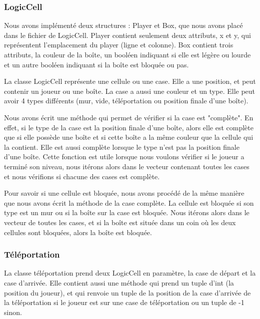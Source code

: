 \documentclass[utf8]{article}
\begin{document}
\begin{large}
\subsubsection{LogicCell}
\indent
\par
Nous avons implémenté deux structures : Player et Box, que nous avons placé dans
le fichier de LogicCell. Player contient seulement deux attributs, x et y, qui
représentent l'emplacement du player (ligne et colonne). Box
contient trois attributs, la couleur de la boîte, un booléen indiquant si elle
est légère ou lourde et un autre booléen indiquant si la boîte est bloquée ou pas.
\par
La classe LogicCell représente une cellule ou une case. Elle a une position, et peut
contenir un joueur ou une boîte. La case a aussi une couleur et un type. Elle
peut avoir 4 types différents (mur, vide, téléportation ou position finale d'une
boîte). 
\par
Nous avons écrit une méthode qui permet de vérifier si la case est "complète".
En effet, si le type de la case est la position finale d'une boîte, alors elle
est complète que si elle possède une boîte et si cette boîte a la même couleur
que la cellule qui la contient. Elle est aussi complète lorsque le type n'est
pas la position finale d'une boîte. Cette fonction est utile lorsque nous
voulons vérifier si le joueur a terminé son niveau, nous itérons alors dans le
vecteur contenant toutes les cases et nous vérifions si chacune des cases est
complète. 
\par
Pour savoir si une cellule est bloquée, nous avons procédé de la même manière
que nous avons écrit la méthode de la case complète. La cellule est bloquée si
son type est un mur ou si la boîte sur la case est bloquée. Nous
itérons alors dans le vecteur de toutes les cases, et si la boîte est située dans un
coin où les deux cellules sont bloquées, alors la boîte est bloquée.
\par
\subsubsection{Téléportation}
\indent
\par
La classe téléportation prend deux LogicCell en paramètre, la case de départ et
la case d'arrivée. Elle contient aussi une méthode qui prend un tuple d'int (la
position du joueur), et qui renvoie un tuple de la position de la case d'arrivée
de la téléportation si le joueur est sur une case de téléportation ou un tuple
de -1 sinon.
\par

\end{large}
\end{document}

